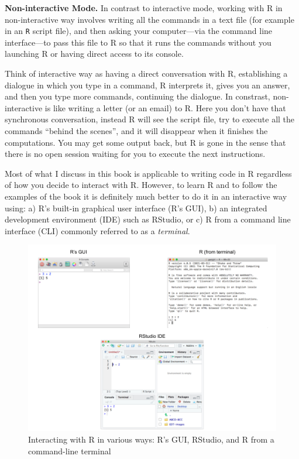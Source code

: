 \documentclass[
]{book}
\begin{document}
\textbf{Non-interactive Mode.} In contrast to interactive mode, working with R in non-interactive way involves writing all the commands in a text file (for
example in an \texttt{R} script file), and then asking your computer---via the
command line interface---to pass this file to R so that it runs the
commands without you launching R or having direct access to its console.

Think of interactive way as having a direct conversation with R, establishing
a dialogue in which you type in a command, R interprets it, gives you an
answer, and then you type more commands, continuing the dialogue. In constrast,
non-interactive is like writing a letter (or an email) to R. Here you don't
have that synchronous conversation, instead R will see the script file, try to
execute all the commands ``behind the scenes'', and it will disappear when it
finishes the computations. You may get some output back, but R is gone in the
sense that there is no open session waiting for you to execute the next
instructions.

Most of what I discuss in this book is applicable to writing code in R
regardless of how you decide to interact with R. However, to learn R and to
follow the examples of the book it is definitely much better to do it in an
interactive way using: a) R's built-in graphical user interface (R's GUI),
b) an integrated development environment (IDE) such as RStudio, or
c) R from a command line interface (CLI) commonly referred to as a \emph{terminal}.

\begin{figure}

{\centering \includegraphics[width=0.9\linewidth]{images/install/r-interactive-ways} 

}

\caption{Interacting with R in various ways: R's GUI, RStudio, and R from a command-line terminal}\label{fig:unnamed-chunk-3}
\end{figure}
\end{document}
